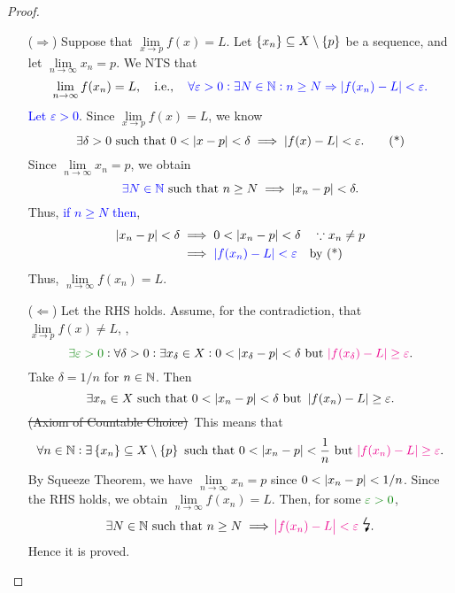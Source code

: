 \documentclass[11pt,openany]{article}
\begin{document}
\begin{proof}
\begin{itemize}
	\item[($\Rightarrow$)] Suppose that $\lim\limits_{x\to p}f(x)=L$. Let $\set{x_n}\subseteq X\setminus\set{p}$ be a sequence, and let $\lim\limits_{n\to\infty}x_n=p$. We NTS that \[
	\lim\limits_{n\to\infty}f(x_n)=L,\quad\textnormal{i.e.},\color{blue}\quad\forall\varepsilon>0:\exists N\in\mathbb{N}:n\geq N\Rightarrow\abs[0]{f(x_n)-L}<\varepsilon.
	\] \textcolor{blue}{Let $\varepsilon>0$}. Since $\lim\limits_{x\to p}f(x)=L$, we know \begin{equation*}
		\exists\delta>0\ \text{such that}\ 0<\abs[0]{x-p}<\delta\implies\abs[0]{f(x)-L}<\varepsilon.\tag{*}
	\end{equation*} Since $\lim\limits_{n\to\infty}x_n=p$, we obtain \[
	\textcolor{blue}{\exists N\in\N}\ \text{such that}\ n\geq N\implies\abs[0]{x_n-p}<\delta.
	\] Thus, \textcolor{blue}{if $n\geq N$ then}, \begin{align*}
		\abs[0]{x_n-p}<\delta&\implies 0<\abs[0]{x_n-p}<\delta\quad\because x_n\neq p \\
		&\implies\textcolor{blue}{\abs[0]{f(x_n)-L}<\varepsilon}\quad\text{by (*)}
	\end{align*} Thus, $\lim\limits_{n\to\infty}f(x_n)=L$.
	\item[($\Leftarrow$)] Let the RHS holds. Assume, for the contradiction, that $\lim\limits_{x\to p} f(x)\neq L$, \ie, \[
	\textcolor{green!50!black}{\exists\varepsilon>0}:\forall\delta>0:\exists x_\delta\in X:0<\abs[0]{x_\delta-p}<\delta\ \text{but}\ \textcolor{magenta}{\abs[0]{f(x_\delta)-L}\geq\varepsilon}.
	\] Take $\delta=1/n$ for $n\in\mathbb{N}$. Then \[
	\exists x_n\in X\ \text{such that}\ 0<\abs[0]{x_n-p}<\delta\ \text{but}\ \abs[0]{f(x_n)-L}\geq \varepsilon.
	\] \textcolor{gray!50}{\st{(Axiom of Countable Choice)}}\ This means that \[
	\forall n\in\N:\exists\set{x_n}\subseteq X\setminus\set{p}\ \text{such that}\ 0<\abs[0]{x_n-p}<\frac{1}{n}\ \text{but}\ \textcolor{magenta}{\abs[0]{f(x_n)-L}\geq \varepsilon}.
	\] By Squeeze Theorem, we have $\lim\limits_{n\to\infty}x_n=p$ since $0<\abs[0]{x_n-p}<1/n$. Since the RHS holds, we obtain $\lim\limits_{n\to\infty}f(x_n)=L$. Then, for some $\textcolor{green!50!black}{\varepsilon>0}$, \[
	\exists N\in\N\ \text{such that}\ n\geq N\implies\textcolor{magenta}{\abs{f(x_n)-L}<\varepsilon}\ \text{\Large\lightning}.
	\] Hence it is proved.
\end{itemize}
\end{proof}
\end{document}
